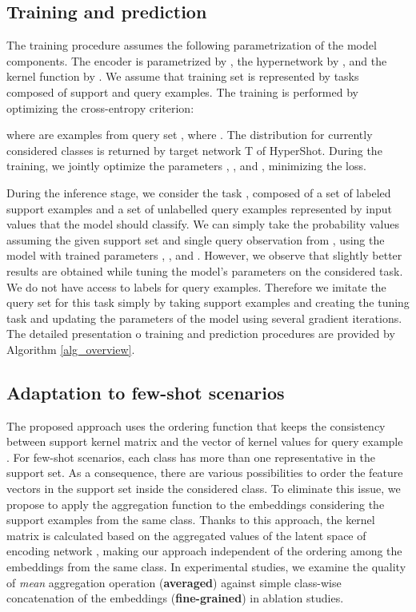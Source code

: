 \documentclass[nohyperref]{article}
\def\our{HyperShot}
\theoremstyle{plain}
\theoremstyle{definition}
\theoremstyle{remark}
\begin{document}
\subsection{Training and prediction}

The training procedure assumes the following parametrization of the model components. The encoder  is parametrized by , the hypernetwork  by , and the kernel function  by . We assume that training set  is represented by tasks  composed of support  and query  examples. The training is performed by optimizing the cross-entropy criterion:


where  are examples from query set , where . The distribution for currently considered classes  is returned by target network T of \our{}. During the training, we jointly optimize the parameters , ,  and , minimizing the  loss.  

During the inference stage, we consider the task , composed of a set of labeled support examples  and a set of unlabelled query examples represented by input values  that the model should classify. We can simply take the probability values  assuming the given support set  and single query observation  from , using the model with trained parameters , ,  and . However, we observe that slightly better results are obtained while tuning the model's parameters on the considered task. We do not have access to  labels for query examples. Therefore we imitate the query set for this task simply by taking support examples and creating the tuning task  and updating the parameters of the model using several gradient iterations. The detailed presentation o training and prediction procedures are provided by Algorithm \ref{alg_overview}. 

\subsection{Adaptation to few-shot scenarios}

The proposed approach uses the ordering function  that keeps the consistency between support kernel matrix  and the vector of kernel values  for query example . For few-shot scenarios, each class has more than one representative in the support set. As a consequence, there are various possibilities to order the feature vectors in the support set inside the considered class. To eliminate this issue, we propose to apply the aggregation function to the embeddings  considering the support examples from the same class. Thanks to this approach, the kernel matrix is calculated based on the aggregated values of the latent space of encoding network , making our approach independent of the ordering among the embeddings from the same class. In experimental studies, we examine the quality of \emph{mean} aggregation operation (\textbf{averaged}) against simple class-wise concatenation of the embeddings (\textbf{fine-grained}) in ablation studies. 
\end{document}
